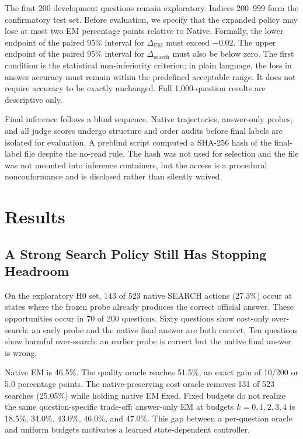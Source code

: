\documentclass[11pt,a4paper]{article}
\begin{document}
The first 200 development questions remain exploratory. Indices 200--999 form the confirmatory test set. Before evaluation, we specify that the expanded policy may lose at most two EM percentage points relative to Native. Formally, the lower endpoint of the paired 95\% interval for $\Delta_{\mathrm{EM}}$ must exceed $-0.02$. The upper endpoint of the paired 95\% interval for $\Delta_{\mathrm{search}}$ must also be below zero. The first condition is the statistical non-inferiority criterion; in plain language, the loss in answer accuracy must remain within the predefined acceptable range. It does not require accuracy to be exactly unchanged. Full 1,000-question results are descriptive only.

Final inference follows a blind sequence. Native trajectories, answer-only probes, and all judge scores undergo structure and order audits before final labels are isolated for evaluation. A preblind script computed a SHA-256 hash of the final-label file despite the no-read rule. The hash was not used for selection and the file was not mounted into inference containers, but the access is a procedural nonconformance and is disclosed rather than silently waived.

\section{Results}

\subsection{A Strong Search Policy Still Has Stopping Headroom}

On the exploratory H0 set, 143 of 523 native SEARCH actions (27.3\%) occur at states where the frozen probe already produces the correct official answer. These opportunities occur in 70 of 200 questions. Sixty questions show cost-only over-search: an early probe and the native final answer are both correct. Ten questions show harmful over-search: an earlier probe is correct but the native final answer is wrong.

Native EM is 46.5\%. The quality oracle reaches 51.5\%, an exact gain of 10/200 or 5.0 percentage points. The native-preserving cost oracle removes 131 of 523 searches (25.05\%) while holding native EM fixed. Fixed budgets do not realize the same question-specific trade-off: answer-only EM at budgets $k=0,1,2,3,4$ is 18.5\%, 34.0\%, 43.0\%, 46.0\%, and 47.0\%. This gap between a per-question oracle and uniform budgets motivates a learned state-dependent controller.
\end{document}
